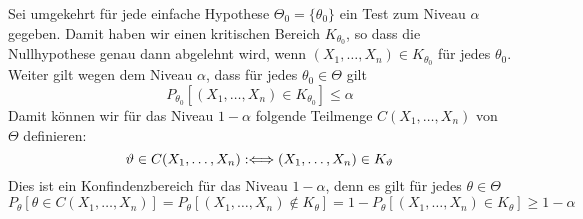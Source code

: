 \begin{mdframed}
Sei umgekehrt für jede einfache Hypothese $\Theta_0 = \{\theta_0\}$ ein Test zum Niveau $\alpha$ gegeben. Damit haben wir einen kritischen Bereich $K_{\theta_0}$, so dass die Nullhypothese genau dann abgelehnt wird, wenn $(X_1,\dots,X_n) \in K_{\theta_0}$ für jedes $\theta_0$. Weiter gilt wegen dem Niveau $\alpha$, dass für jedes $\theta_0 \in \Theta$ gilt
$$ P_{\theta_0} [(X_1,\dots, X_n) \in K_{\theta_0}] \leq \alpha$$
Damit können wir für das Niveau $1-\alpha$ folgende Teilmenge $C(X_1,\dots, X_n)$ von $\Theta$ definieren:
$$ \vartheta \in C(X_1,\dots, X_n) :\Longleftrightarrow (X_1,\dots, X_n) \in K_\vartheta$$
Dies ist ein Konfindenzbereich für das Niveau $1-\alpha$, denn es gilt für jedes $\theta \in \Theta$
$$ P_\theta [\theta \in C(X_1,\dots,X_n)] = P_\theta [(X_1,\dots, X_n) \notin K_\theta] = 1 - P_\theta [(X_1,\dots, X_n) \in K_\theta] \geq 1 - \alpha $$
\end{mdframed}